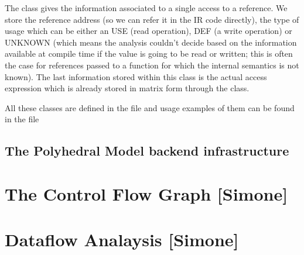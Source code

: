 The  class gives the information associated to a single access
to a reference. We store the reference address (so we can refer it in the IR
code directly), the type of usage which can be either an USE (read operation),
DEF (a write operation) or UNKNOWN (which means the analysis couldn't decide
based on the information available at compile time if the value is going to be
read or written; this is often the case for references passed to a function for
which the internal semantics is not known). The last information stored within
this class is the actual access expression which is already stored in matrix
form through the  class.

All these classes are defined in the  file
and usage examples of them can be found in the file


\subsection{The Polyhedral Model backend infrastructure}




\section{The Control Flow Graph [Simone]}
\label{insieme:analysis:cfg}



\section{Dataflow Analaysis [Simone]}
\label{insieme:analysis:dtaflow}
